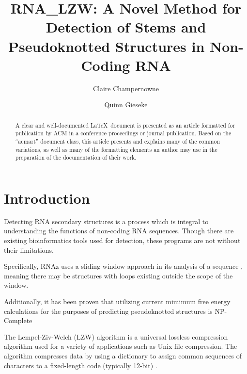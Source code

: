 \documentclass[sigconf]{acmart}
\begin{document}
\title{RNA\_LZW: A Novel Method for Detection of Stems and Pseudoknotted Structures in Non-Coding RNA}

\author{Claire Champernowne}

\author{Quinn Gieseke}

\renewcommand{\shortauthors}{Champernowne and Gieseke, et al.}

\begin{abstract}
  A clear and well-documented \LaTeX\ document is presented as an
  article formatted for publication by ACM in a conference proceedings
  or journal publication. Based on the ``acmart'' document class, this
  article presents and explains many of the common variations, as well
  as many of the formatting elements an author may use in the
  preparation of the documentation of their work.
\end{abstract}


\maketitle




\section{Introduction}
Detecting RNA secondary structures is a process which is integral to understanding the functions of non-coding RNA sequences. Though there are existing bioinformatics tools used for detection, these programs are not without their limitations. 

Specifically, RNAz uses a sliding window approach in its analysis of a sequence \cite{RNAZ2} \cite{Fast}, meaning there may be structures with loops existing outside the scope of the window.

Additionally, it has been proven that utilizing current mimimum free energy calculations for the purposes of predicting pseudoknotted structures is NP-Complete \cite{NP}

The Lempel-Ziv-Welch (LZW) algorithm is a universal lossless compression algorithm used for a variety of applications such as Unix file compression. The algorithm compresses data by using a dictionary to assign common sequences of characters to a fixed-length code (typically 12-bit) \cite{compres}.
\end{document}
